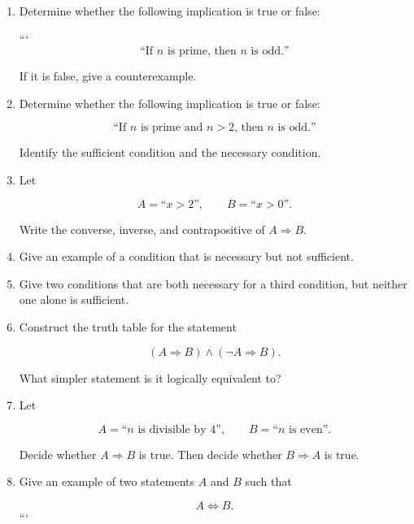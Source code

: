\begin{enumerate}
\item Determine whether the following implication is true or false:

```
\[
\text{``If $n$ is prime, then $n$ is odd.''}
\]


If it is false, give a counterexample.

\item Determine whether the following implication is true or false:


\[
\text{``If $n$ is prime and $n>2$, then $n$ is odd.''}
\]


Identify the sufficient condition and the necessary condition.

\item Let


\[
A = \text{``$x>2$''},
\qquad
B = \text{``$x>0$''}.
\]


Write the converse, inverse, and contrapositive of \(A \Rightarrow B\).

\item Give an example of a condition that is necessary but not sufficient.

\item Give two conditions that are both necessary for a third condition, but
neither one alone is sufficient.

\item Construct the truth table for the statement


\[
(A \Rightarrow B) \land (\neg A \Rightarrow B).
\]


What simpler statement is it logically equivalent to?

\item Let


\[
A = \text{``$n$ is divisible by $4$''},
\qquad
B = \text{``$n$ is even''}.
\]


Decide whether \(A \Rightarrow B\) is true. Then decide whether
\(B \Rightarrow A\) is true.

\item Give an example of two statements \(A\) and \(B\) such that


\[
A \Leftrightarrow B.
\]
```

\end{enumerate}
